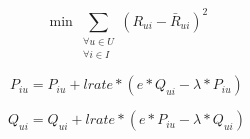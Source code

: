 \documentclass[12pt]{article}
\begin{document}
\begin{equation} \label{minimosQuadrados}
\min\nolimits\sum\limits_{\substack{\forall u \in U\\ \forall i \in I}} (R_{ui} - \bar{R}_{ui})^2
\end{equation}

\begin{equation} \label{p}
P_{iu} = P_{iu} + lrate * ( e * Q_{ui} - \lambda * P_{iu})
\end{equation}

\begin{equation} \label{q}
Q_{ui} = Q_{ui} + lrate * ( e * P_{iu} - \lambda * Q_{ui})
\end{equation}



\end{document}
